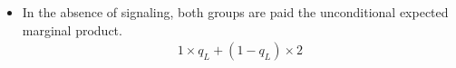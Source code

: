 \begin{frame}
\begin{itemize}\setlength\itemsep{1em}
\item In the absence of signaling, both groups are paid the unconditional expected marginal product.
	\begin{align*}
	1\times q_L + (1 - q_L) \times 2
	\end{align*}
\end{itemize}
\end{frame}
